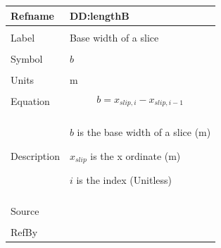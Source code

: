 \documentclass[12pt]{article}
\begin{document}
\noindent \begin{minipage}{\textwidth}
\begin{tabular}{p{} p{}}
\toprule \textbf{Refname} & \textbf{DD:lengthB}
\label{DD:lengthB}
\\ \midrule \\
Label & Base width of a slice
        \\ \midrule \\
        Symbol & $b$
                 \\ \midrule \\
                 Units & m
                         \\ \midrule \\
                         Equation & \begin{displaymath}
                                    b={x_{slip,i}}-{x_{slip,i-1}}
                                    \end{displaymath}
                                    \\ \midrule \\
                                    Description & \begin{symbDescription}
                                                  \item{$b$ is the base width of a slice (m)}
                                                  \item{${x_{slip}}$ is the x ordinate (m)}
                                                  \item{$i$ is the index (Unitless)}
                                                  \end{symbDescription}
                                                  \\ \midrule \\
                                                  Source & \cite{fredlund1977}
                                                           \\ \midrule \\
                                                           RefBy & 
\\ \bottomrule \end{tabular}
\end{minipage}
\par~
\end{document}
